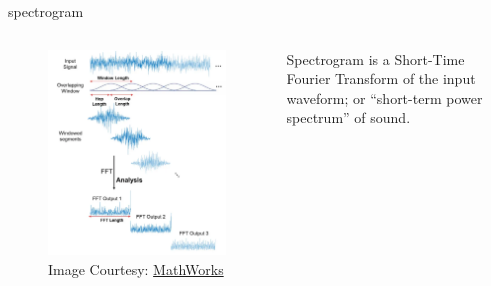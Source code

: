 \documentclass[aspectratio=169,xcolor={dvipsnames,svgnames}]{beamer}
\begin{document}
\begin{frame}[label={sec:orge725335}]{spectrogram}
\begin{columns}
\begin{column}{.45\columnwidth}
\begin{figure}[htbp]
\centering
\includegraphics[width=.9\linewidth]{org-download-images/introduction/2024-09-16_20-59-46_screenshot.png}
\caption{Image Courtesy: \href{https://in.mathworks.com/help/dsp/ref/dsp.stft.html}{MathWorks}}
\end{figure}
\end{column}
\begin{column}{.55\columnwidth}
Spectrogram is a Short-Time Fourier Transform of the
input waveform; or “short-term power spectrum” of
sound.



\end{column}
\end{columns}
\end{frame}
\end{document}
